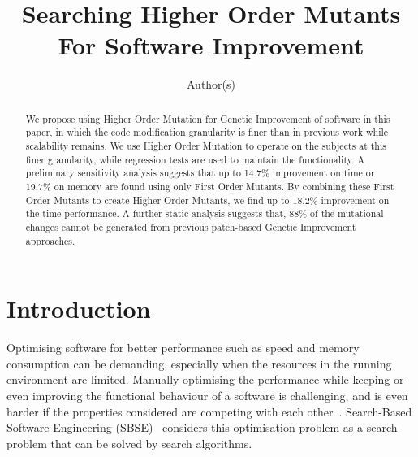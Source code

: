\documentclass[oribibl]{llncs}
\begin{document}
\title{Searching Higher Order Mutants For Software Improvement}

\author{Author(s)
}



\maketitle

\begin{abstract}
We propose using Higher Order Mutation for Genetic Improvement of software in this paper, in which the code modification granularity is finer than in previous work while scalability remains.
We use Higher Order Mutation to operate on the subjects at this finer granularity, while regression tests are used to maintain the functionality.
A preliminary sensitivity analysis suggests that up to 14.7\% improvement on time or 19.7\% on memory are found using only First Order Mutants.
By combining these First Order Mutants to create Higher Order Mutants, we find up to 18.2\% improvement on the time performance.
A further static analysis suggests that, 88\% of the mutational changes cannot be generated from previous patch-based Genetic Improvement approaches.
\end{abstract}

\section{Introduction}
\label{sec_intro}

Optimising software for better performance such as speed and memory consumption can be demanding, especially when the resources in the running environment are limited.
Manually optimising the performance while keeping or even improving the functional behaviour of a software is challenging, 
and is even harder if the properties considered are competing with each other~\cite{Harman:2012:GCC:2351676.2351678}.
Search-Based Software Engineering (SBSE)~\cite{Harman2001833} considers this optimisation problem as a search problem that can be solved by search algorithms.
\end{document}
